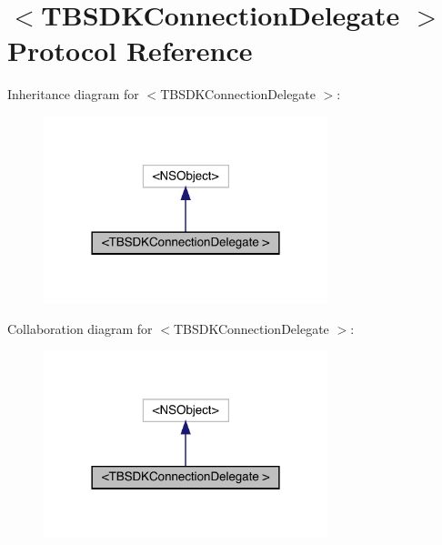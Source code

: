 \hypertarget{protocol_t_b_s_d_k_connection_delegate_01-p}{}\section{$<$T\+B\+S\+D\+K\+Connection\+Delegate $>$ Protocol Reference}
\label{protocol_t_b_s_d_k_connection_delegate_01-p}


Inheritance diagram for $<$T\+B\+S\+D\+K\+Connection\+Delegate $>$\+:\nopagebreak
\begin{figure}[H]
\begin{center}
\leavevmode
\includegraphics[width=234pt]{protocol_t_b_s_d_k_connection_delegate_01-p__inherit__graph}
\end{center}
\end{figure}


Collaboration diagram for $<$T\+B\+S\+D\+K\+Connection\+Delegate $>$\+:\nopagebreak
\begin{figure}[H]
\begin{center}
\leavevmode
\includegraphics[width=234pt]{protocol_t_b_s_d_k_connection_delegate_01-p__coll__graph}
\end{center}
\end{figure}
